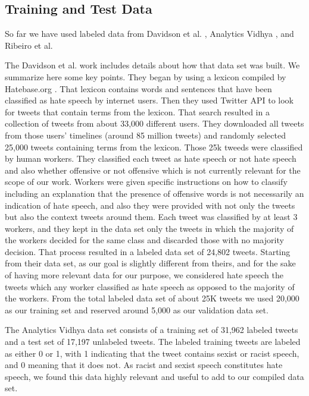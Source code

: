 \documentclass[conference]{sig-alternate-05-2015}
\begin{document}
\subsection{Training and Test Data}
So far we have used labeled data from Davidson et al. \cite{Davidsonetal.}, Analytics Vidhya \cite{vidhya}, and Ribeiro et al. \cite{ribeiro2017like}

The Davidson et al. work includes details about how that data set was built. We summarize here some key points. They began by using a lexicon compiled by Hatebase.org \cite{HateBaseOrg}. That lexicon contains words and sentences that have been classified as hate speech by internet users. Then they used Twitter API to look for tweets that contain terms from the lexicon. That search resulted in a collection of tweets from about 33,000 different users. They downloaded all tweets from those users' timelines (around 85 million tweets) and randomly selected 25,000 tweets containing terms from the lexicon. Those 25k tweeds were classified by human workers. They classified each tweet as hate speech or not hate speech and also whether offensive or not offensive which is not currently relevant for the scope of our work. Workers were given specific instructions on how to classify including an explanation that the presence of offensive words is not necessarily an indication of hate speech, and also they were provided with not only the tweets but also the context tweets around them. Each tweet was classified by at least 3 workers, and they kept in the data set only the tweets in which the majority of the workers decided for the same class and discarded those with no majority decision.  That process resulted in a labeled data set of 24,802 tweets.
Starting from their data set, as our goal is slightly different from theirs, and for the sake of having more relevant data for our purpose,  we considered hate speech the tweets which any worker classified as hate speech as opposed to the majority of the workers. 
From the total labeled data set of about 25K tweets we used 20,000 as our training set and reserved around 5,000 as our validation data set.

The Analytics Vidhya data set consists of a training set of 31,962 labeled tweets and a test set of 17,197 unlabeled tweets. The labeled training tweets are labeled as either 0 or 1, with 1 indicating that the tweet contains sexist or racist speech, and 0 meaning that it does not. As racist and sexist speech constitutes hate speech, we found this data highly relevant and useful to add to our compiled data set.
\end{document}
